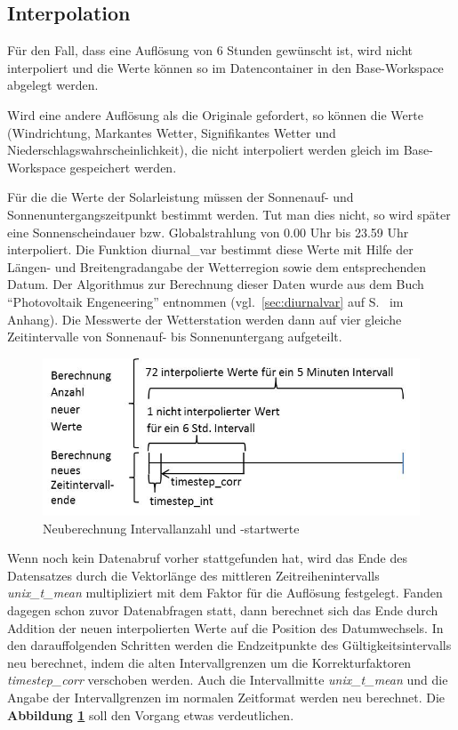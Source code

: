 \subsection{Interpolation}
Für den Fall, dass eine Auflösung von 6 Stunden gewünscht ist, wird nicht interpoliert und die Werte können so im Datencontainer in den Base-Workspace abgelegt werden.   
 
Wird eine andere Auflösung als die Originale gefordert, so können die Werte (Windrichtung, Markantes Wetter, Signifikantes Wetter und Niederschlagswahrscheinlichkeit), die nicht interpoliert werden gleich im Base-Workspace gespeichert werden. 
 
Für die die Werte der Solarleistung müssen der Sonnenauf- und Sonnenuntergangszeitpunkt bestimmt werden. Tut man dies nicht, so wird später eine Sonnenscheindauer bzw. Globalstrahlung von 0.00 Uhr bis 23.59 Uhr interpoliert. Die Funktion \textsf{diurnal\_var} bestimmt diese Werte mit Hilfe der Längen- und Breitengradangabe der Wetterregion sowie dem entsprechenden Datum. Der Algorithmus zur Berechnung dieser Daten wurde aus dem Buch \enquote{Photovoltaik Engeneering} entnommen (vgl.~\ref{sec:diurnalvar} auf S.~\pageref{sec:diurnalvar} im Anhang). Die Messwerte der Wetterstation werden dann auf vier gleiche Zeitintervalle von Sonnenauf- bis Sonnenuntergang aufgeteilt. 

\begin{figure}[!h]
\centering
\includegraphics[scale=0.7]{programm/intneuber}
\caption{Neuberechnung Intervallanzahl und -startwerte}
\label{fig:intneuber}
\end{figure}
Wenn noch kein Datenabruf vorher stattgefunden hat, wird das Ende des Datensatzes durch die Vektorlänge des mittleren Zeitreihenintervalls \textit{unix\_t\_mean} multipliziert mit dem Faktor für die Auflösung festgelegt. Fanden dagegen schon zuvor Datenabfragen statt, dann berechnet sich das Ende durch Addition der neuen interpolierten Werte auf die Position des Datumwechsels. In den darauffolgenden Schritten werden die Endzeitpunkte des Gültigkeitsintervalls neu berechnet, indem die alten Intervallgrenzen um die Korrekturfaktoren \textit{timestep\_corr} verschoben werden. Auch die Intervallmitte \textit{unix\_t\_mean} und die Angabe der Intervallgrenzen im normalen Zeitformat werden neu berechnet. Die \textbf{Abbildung \ref{fig:intneuber}} soll den Vorgang etwas verdeutlichen.    
